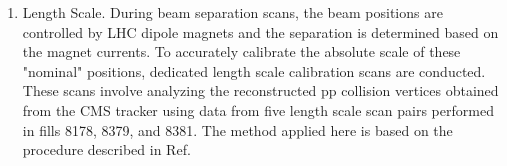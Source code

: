 \begin{enumerate}
\item Length Scale. 
During beam separation scans, the beam positions are controlled by LHC dipole magnets and the separation is determined based on the magnet currents. To accurately calibrate the absolute scale of these "nominal" positions, dedicated length scale calibration scans are conducted. These scans involve analyzing the reconstructed pp collision vertices obtained from the CMS tracker using data from five length scale scan pairs performed in fills 8178, 8379, and 8381. The method applied here is based on the procedure described in Ref. \cite{lumi_precise_2015_2016}  






\end{enumerate}

